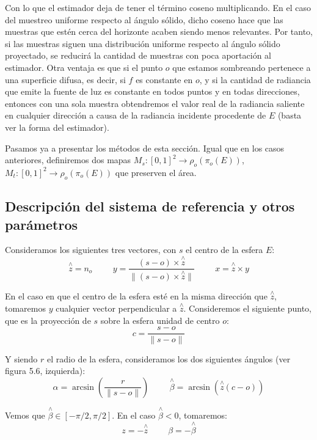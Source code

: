 Con lo que el estimador deja de tener el término coseno multiplicando. En el caso del muestreo uniforme respecto al ángulo sólido, dicho coseno hace que las muestras que estén cerca del horizonte acaben siendo menos relevantes. Por tanto, si las muestras siguen una distribución uniforme respecto al ángulo sólido proyectado, se reducirá la cantidad de muestras con poca aportación al estimador. Otra ventaja es que si el punto $o$ que estamos sombreando pertenece a una superficie difusa, es decir, si $f$ es constante en $o$, y si la cantidad de radiancia que emite la fuente de luz es constante en todos puntos y en todas direcciones, entonces con una sola muestra obtendremos el valor real de la radiancia saliente en cualquier dirección a causa de la radiancia incidente procedente de $E$ (basta ver la forma del estimador).

Pasamos ya a presentar los métodos de esta sección. Igual que en los casos anteriores, definiremos dos mapas $M_s:[0,1]^2\rightarrow \rho_o(\pi_o(E))$, $M_t:[0,1]^2\rightarrow \rho_o(\pi_o(E))$ que preserven el área. 

\subsection{Descripción del sistema de referencia y otros parámetros}
Consideramos los siguientes tres vectores, con $s$ el centro de la esfera $E$:
$$\overset{\wedge}{z} = n_o\hspace{1cm} y= \frac{(s-o)\times \overset{\wedge}{z}}{\|(s-o)\times \overset{\wedge}{z}\|} \hspace{1cm} x=\overset{\wedge}{z}\times y$$

En el caso en que el centro de la esfera esté en la misma dirección que $\overset{\wedge}{z}$, tomaremos $y$ cualquier vector perpendicular a $\overset{\wedge}{z}$. Consideremos el siguiente punto, que es la proyección de $s$ sobre la esfera unidad de centro $o$:
$$c=\frac{s-o}{\|s-o\|}$$

Y siendo $r$ el radio de la esfera, consideramos los dos siguientes ángulos (ver figura 5.6, izquierda):
$$\alpha = \arcsin(\frac{r}{\|s-o\|}) \hspace{1cm} \overset{\wedge}{\beta}=\arcsin(\overset{\wedge}{z}(c-o))$$

Vemos que $\overset{\wedge}{\beta}\in[-\pi/2,\pi/2]$. En el caso $\overset{\wedge}{\beta}<0$, tomaremos:
$$z = -\overset{\wedge}{z}\hspace{1cm} \beta = -\overset{\wedge}{\beta}$$

